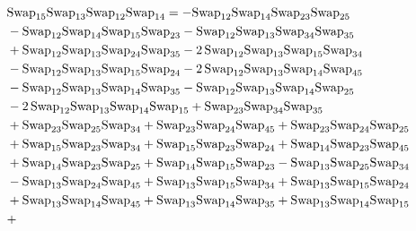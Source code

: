 \documentclass[12pt,dvipsnames,accepted=2016-08-18,a4paper,onecolumn]{quantumarticle}
\numberwithin{equation}{section}
\theoremstyle{definition}
\begin{document}
\begin{align*}
&\textnormal{Swap}_{15}   \textnormal{Swap}_{13}   \textnormal{Swap}_{12}   \textnormal{Swap}_{14} = -\textnormal{Swap}_{12} \textnormal{Swap}_{14} \textnormal{Swap}_{23} \textnormal{Swap}_{25}\\ & - \textnormal{Swap}_{12} \textnormal{Swap}_{14} \textnormal{Swap}_{15} \textnormal{Swap}_{23} - \textnormal{Swap}_{12} \textnormal{Swap}_{13} \textnormal{Swap}_{34} \textnormal{Swap}_{35}\\ & + \textnormal{Swap}_{12} \textnormal{Swap}_{13} \textnormal{Swap}_{24} \textnormal{Swap}_{35} -
        2\,\textnormal{Swap}_{12} \textnormal{Swap}_{13} \textnormal{Swap}_{15} \textnormal{Swap}_{34}\\ & - \textnormal{Swap}_{12} \textnormal{Swap}_{13} \textnormal{Swap}_{15} \textnormal{Swap}_{24} - 2\,\textnormal{Swap}_{12} \textnormal{Swap}_{13} \textnormal{Swap}_{14} \textnormal{Swap}_{45}\\ & -
        \textnormal{Swap}_{12} \textnormal{Swap}_{13} \textnormal{Swap}_{14} \textnormal{Swap}_{35} - \textnormal{Swap}_{12} \textnormal{Swap}_{13} \textnormal{Swap}_{14} \textnormal{Swap}_{25}\\ & - 2\,\textnormal{Swap}_{12} \textnormal{Swap}_{13} \textnormal{Swap}_{14} \textnormal{Swap}_{15} + \textnormal{Swap}_{23} \textnormal{Swap}_{34} \textnormal{Swap}_{35}\\ & +
        \textnormal{Swap}_{23} \textnormal{Swap}_{25} \textnormal{Swap}_{34} + \textnormal{Swap}_{23} \textnormal{Swap}_{24} \textnormal{Swap}_{45} + \textnormal{Swap}_{23} \textnormal{Swap}_{24} \textnormal{Swap}_{25}\\ & + \textnormal{Swap}_{15} \textnormal{Swap}_{23} \textnormal{Swap}_{34} + \textnormal{Swap}_{15} \textnormal{Swap}_{23} \textnormal{Swap}_{24} +
        \textnormal{Swap}_{14} \textnormal{Swap}_{23} \textnormal{Swap}_{45}\\ & + \textnormal{Swap}_{14} \textnormal{Swap}_{23} \textnormal{Swap}_{25} + \textnormal{Swap}_{14} \textnormal{Swap}_{15} \textnormal{Swap}_{23} - \textnormal{Swap}_{13} \textnormal{Swap}_{25} \textnormal{Swap}_{34}\\ & - \textnormal{Swap}_{13} \textnormal{Swap}_{24} \textnormal{Swap}_{45} +
        \textnormal{Swap}_{13} \textnormal{Swap}_{15} \textnormal{Swap}_{34} + \textnormal{Swap}_{13} \textnormal{Swap}_{15} \textnormal{Swap}_{24}\\ & + \textnormal{Swap}_{13} \textnormal{Swap}_{14} \textnormal{Swap}_{45} + \textnormal{Swap}_{13} \textnormal{Swap}_{14} \textnormal{Swap}_{35} + \textnormal{Swap}_{13} \textnormal{Swap}_{14} \textnormal{Swap}_{15}\\ & +

\end{align*}
\end{document}

